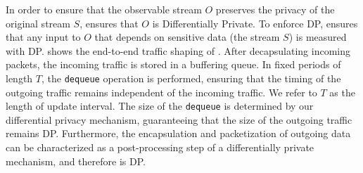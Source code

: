 In order to ensure that the observable stream $O$ preserves the privacy of the
original stream $S$, {\sys} ensures that $O$ is Differentially Private.
To enforce DP, {\sys} ensures that any input to $O$ that depends on sensitive
data (the stream $S$) is measured with DP. 
 shows the end-to-end traffic shaping of
{\sys}.
After decapsulating incoming packets, the incoming traffic is stored in a
buffering queue. In fixed periods of length $T$, the \texttt{dequeue} operation is performed,
ensuring that the timing of the outgoing traffic remains independent of the
incoming traffic. 
We refer to $T$ as the length of update interval.
The size of the \texttt{dequeue} is determined by our
differential privacy mechanism, guaranteeing that the size of the outgoing
traffic remains DP.
Furthermore, the encapsulation and packetization of outgoing data can be
characterized as a post-processing step of a differentially private mechanism,
and therefore is DP.






